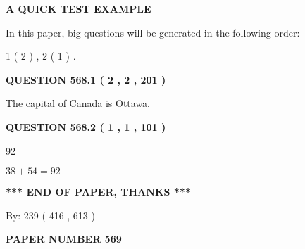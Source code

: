 \documentclass[12pt]{article}
\begin{document}
   
 \vspace{0.2in}
{\LARGE {\textbf{ A QUICK TEST EXAMPLE}}}
   
   
   
\vspace{0.2in}
   
In this paper, big questions will be generated in the following order: 
   
   
   1 ( 2 )
 ,
   2 ( 1 )
 .
  
\vspace{0.2in}
  
{\textbf{\Large{QUESTION
568.1 
 ( 2 , 2 , 201 )
}}}
  
  
 
 
\noindent{}
 
 
The capital of Canada is Ottawa.
 
 
 
 
  
\vspace{0.2in}
  
{\textbf{\Large{QUESTION
568.2 
 ( 1 , 1 , 101 )
}}}
  
  
 
 
\noindent{}

92
 
 
 
 
\noindent{}

$ %
38 +  %
54=   %
92$
 
 
   
   
 \vspace{0.2in}
 
   
   
   
   
\vspace{1.0in} 
{\textbf{\large{ *** END OF PAPER, THANKS *** }}} 
   
   
\hspace{1.0in} By: 
 239 ( 416 ,  613 )
   
   
   
   
\newpage 
\setcounter{page}{ 
   569001 } 
   
   
   
   
 {\textbf{ \Large{ PAPER NUMBER  569  }}}
   
   
\vspace{0.2in}
   
\end{document}

